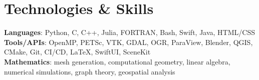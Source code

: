 \section{Technologies \& Skills}
 \begin{itemize}[leftmargin=0.15in, label={}]
    \small{\item{
     \textbf{Languages}{: Python, C, C++, Julia, FORTRAN, Bash, Swift, Java, HTML/CSS} \\
     \textbf{Tools/APIs}{: OpenMP, PETSc, VTK, GDAL, OGR, ParaView, Blender, QGIS, CMake, Git, CI/CD, \LaTeX, SwiftUI, SceneKit} \\
     \textbf{Mathematics}{: mesh generation, computational geometry, linear algebra, numerical simulations, graph theory, geospatial analysis}
    }}
 \end{itemize}